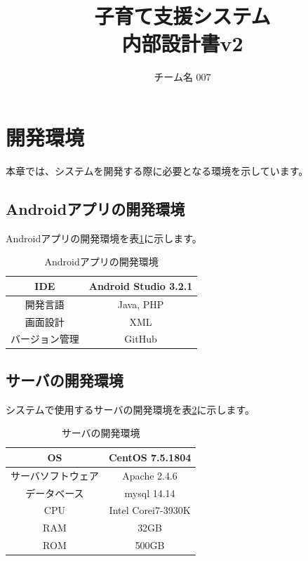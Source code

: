 \documentclass[a4j]{jarticle}
\title{
\vspace{30mm}
{\bf 子育て支援システム}
\\
\vspace{5mm}
{\bf 内部設計書v2\\
}
\vspace{120mm}
}
\author{
\vspace{5mm}
チーム名 007\\
\vspace{5mm}
}
\begin{document}
\maketitle
\tableofcontents
\newpage

\section{開発環境}
本章では、システムを開発する際に必要となる環境を示しています。

\subsection{Androidアプリの開発環境}
Androidアプリの開発環境を表\ref{Application_Development_Environment}に示します。

\begin{table}[H]
    \caption{Androidアプリの開発環境}
    \label{Application_Development_Environment}
    \begin{center}
        \begin{tabular}{|c||c|} \hline
            IDE & Android Studio 3.2.1 \\ \hline
            開発言語 & Java, PHP \\ \hline
            画面設計 & XML \\ \hline
            バージョン管理 & GitHub \\ \hline
        \end{tabular}
    \end{center}
\end{table}

\subsection{サーバの開発環境}
システムで使用するサーバの開発環境を表\ref{Server_Development_Environment}に示します。
\begin{table}[H]
    \caption{サーバの開発環境}
    \label{Server_Development_Environment}
    \begin{center}
        \begin{tabular}{|c||c|} \hline
            OS & CentOS 7.5.1804 \\ \hline
            サーバソフトウェア & Apache 2.4.6 \\ \hline
            データベース & mysql 14.14 \\ \hline
            CPU & Intel Corei7-3930K \\ \hline
            RAM & 32GB \\ \hline
            ROM & 500GB \\ \hline
        \end{tabular}
    \end{center}
\end{table}
\end{document}
